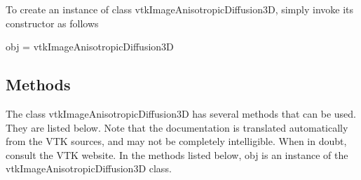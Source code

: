 To create an instance of class vtk\-Image\-Anisotropic\-Diffusion3\-D, simply invoke its constructor as follows \begin{DoxyVerb}  obj = vtkImageAnisotropicDiffusion3D
\end{DoxyVerb}
 \hypertarget{vtkwidgets_vtkxyplotwidget_Methods}{}\subsection{Methods}\label{vtkwidgets_vtkxyplotwidget_Methods}
The class vtk\-Image\-Anisotropic\-Diffusion3\-D has several methods that can be used. They are listed below. Note that the documentation is translated automatically from the V\-T\-K sources, and may not be completely intelligible. When in doubt, consult the V\-T\-K website. In the methods listed below, {\ttfamily obj} is an instance of the vtk\-Image\-Anisotropic\-Diffusion3\-D class. 
